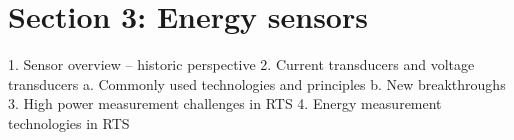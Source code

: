 


\section{Section 3: Energy sensors}

1.	Sensor overview – historic perspective
2.	Current transducers and voltage transducers
a.	Commonly used technologies and principles
b.	New breakthroughs
3.	High power measurement challenges in RTS
4.	Energy measurement technologies in RTS 